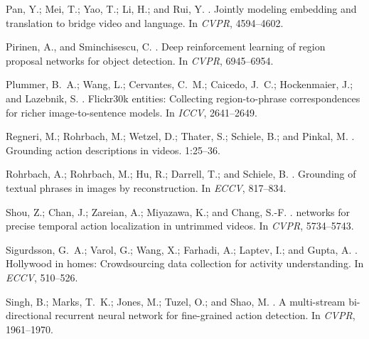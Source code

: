 \documentclass[letterpaper]{article} %
\begin{document}
\begin{thebibliography}{}
Pan, Y.; Mei, T.; Yao, T.; Li, H.; and Rui, Y.
.
\newblock Jointly modeling embedding and translation to bridge video and
  language.
\newblock In {\em CVPR},  4594--4602.

Pirinen, A., and Sminchisescu, C.
.
\newblock Deep reinforcement learning of region proposal networks for object
  detection.
\newblock In {\em CVPR},  6945--6954.

Plummer, B.~A.; Wang, L.; Cervantes, C.~M.; Caicedo, J.~C.; Hockenmaier, J.;
  and Lazebnik, S.
.
\newblock Flickr30k entities: Collecting region-to-phrase correspondences for
  richer image-to-sentence models.
\newblock In {\em ICCV},  2641--2649.

Regneri, M.; Rohrbach, M.; Wetzel, D.; Thater, S.; Schiele, B.; and Pinkal, M.
.
\newblock Grounding action descriptions in videos.
  1:25--36.

Rohrbach, A.; Rohrbach, M.; Hu, R.; Darrell, T.; and Schiele, B.
.
\newblock Grounding of textual phrases in images by reconstruction.
\newblock In {\em ECCV},  817--834.

Shou, Z.; Chan, J.; Zareian, A.; Miyazawa, K.; and Chang, S.-F.
.
 networks for precise temporal
  action localization in untrimmed videos.
\newblock In {\em CVPR},  5734--5743.

Sigurdsson, G.~A.; Varol, G.; Wang, X.; Farhadi, A.; Laptev, I.; and Gupta, A.
.
\newblock Hollywood in homes: Crowdsourcing data collection for activity
  understanding.
\newblock In {\em ECCV},  510--526.

Singh, B.; Marks, T.~K.; Jones, M.; Tuzel, O.; and Shao, M.
.
\newblock A multi-stream bi-directional recurrent neural network for
  fine-grained action detection.
\newblock In {\em CVPR},  1961--1970.


\end{thebibliography}
\end{document}
